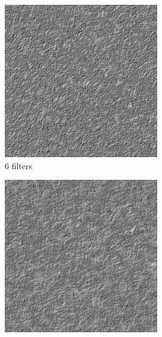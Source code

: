 \documentclass[11pt, oneside]{article}   	%
\begin{document}
\begin{figure}[H]
    \begin{subfigure}[b]{0.3\textwidth}
        \includegraphics[width=\textwidth]{stucco6}
        \caption{6 filters}
        \label{fig:stucco6}
    \end{subfigure}
    \begin{subfigure}[b]{0.3\textwidth}
        \includegraphics[width=\textwidth]{stucco12}

\end{subfigure}
\end{figure}
\end{document}
